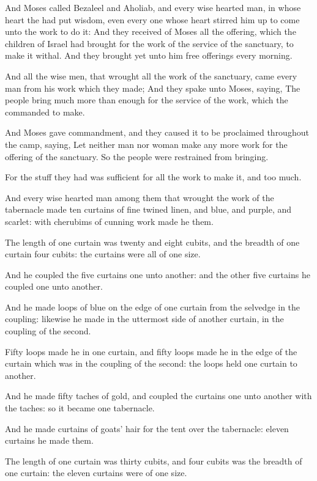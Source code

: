 \verse And Moses called Bezaleel and Aholiab, and every wise hearted man, in whose heart the \LORD had put wisdom, even every one whose heart stirred him up to come unto the work to do it: \verse And they received of Moses all the offering, which the children of Israel had brought for the work of the service of the sanctuary, to make it withal. And they brought yet unto him free offerings every morning.

\verse And all the wise men, that wrought all the work of the sanctuary, came every man from his work which they made; \verse And they spake unto Moses, saying, The people bring much more than enough for the service of the work, which the \LORD commanded to make.

\verse And Moses gave commandment, and they caused it to be proclaimed throughout the camp, saying, Let neither man nor woman make any more work for the offering of the sanctuary. So the people were restrained from bringing.

\verse For the stuff they had was sufficient for all the work to make it, and too much.

\verse And every wise hearted man among them that wrought the work of the tabernacle made ten curtains of fine twined linen, and blue, and purple, and scarlet: with cherubims of cunning work made he them.

\verse The length of one curtain was twenty and eight cubits, and the breadth of one curtain four cubits: the curtains were all of one size.

\verse And he coupled the five curtains one unto another: and the other five curtains he coupled one unto another.

\verse And he made loops of blue on the edge of one curtain from the selvedge in the coupling: likewise he made in the uttermost side of another curtain, in the coupling of the second.

\verse Fifty loops made he in one curtain, and fifty loops made he in the edge of the curtain which was in the coupling of the second: the loops held one curtain to another.

\verse And he made fifty taches of gold, and coupled the curtains one unto another with the taches: so it became one tabernacle.

\verse And he made curtains of goats' hair for the tent over the tabernacle: eleven curtains he made them.

\verse The length of one curtain was thirty cubits, and four cubits was the breadth of one curtain: the eleven curtains were of one size.

